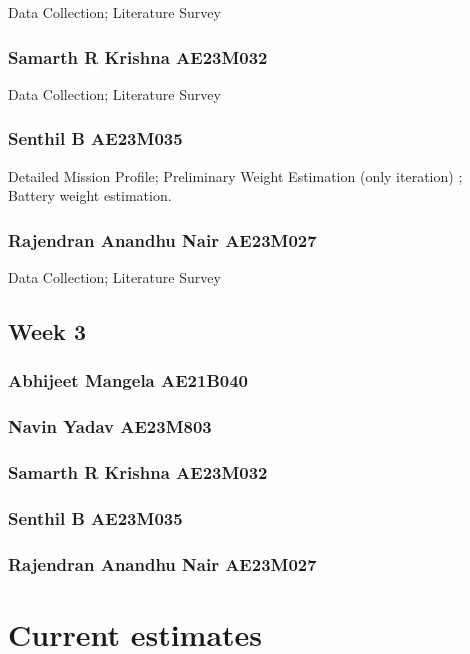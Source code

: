 \documentclass[12 pt]{article}
\begin{document}
Data Collection; Literature Survey

\subsubsection{Samarth R Krishna AE23M032}

Data Collection; Literature Survey

\subsubsection{Senthil B AE23M035}

Detailed Mission Profile; Preliminary Weight Estimation (only iteration) ; Battery weight estimation.

\subsubsection{Rajendran Anandhu Nair AE23M027}

Data Collection; Literature Survey




\subsection{Week 3}

\subsubsection{Abhijeet Mangela AE21B040}


\subsubsection{Navin Yadav AE23M803}





\subsubsection{Samarth R Krishna AE23M032}



\subsubsection{Senthil B AE23M035}



\subsubsection{Rajendran Anandhu Nair AE23M027}



\section{Current estimates}
\end{document}
